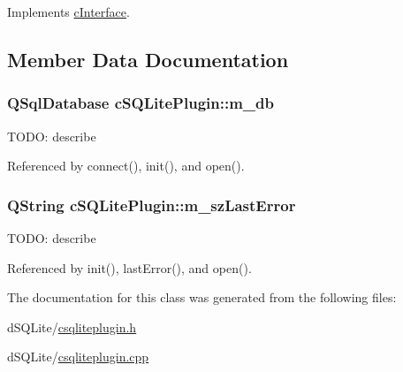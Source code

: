Implements \hyperlink{classc_interface_aadc382036174c2a25bb2c23733830d33}{c\+Interface}.



\subsection{Member Data Documentation}
\subsubsection[{\texorpdfstring{m\+\_\+db}{m_db}}]{\setlength{\rightskip}{0pt plus 5cm}Q\+Sql\+Database c\+S\+Q\+Lite\+Plugin\+::m\+\_\+db\hspace{0.3cm}{\ttfamily [protected]}}\hypertarget{classc_s_q_lite_plugin_a3e3b9845869292d92f7d37e1ffa90df5}{}\label{classc_s_q_lite_plugin_a3e3b9845869292d92f7d37e1ffa90df5}
T\+O\+DO\+: describe 

Referenced by connect(), init(), and open().

\subsubsection[{\texorpdfstring{m\+\_\+sz\+Last\+Error}{m_szLastError}}]{\setlength{\rightskip}{0pt plus 5cm}Q\+String c\+S\+Q\+Lite\+Plugin\+::m\+\_\+sz\+Last\+Error\hspace{0.3cm}{\ttfamily [protected]}}\hypertarget{classc_s_q_lite_plugin_a2f6c0e82b435799bd544d8a1847f4d1a}{}\label{classc_s_q_lite_plugin_a2f6c0e82b435799bd544d8a1847f4d1a}
T\+O\+DO\+: describe 

Referenced by init(), last\+Error(), and open().



The documentation for this class was generated from the following files\+:\begin{DoxyCompactItemize}
\item 
d\+S\+Q\+Lite/\hyperlink{csqliteplugin_8h}{csqliteplugin.\+h}\item 
d\+S\+Q\+Lite/\hyperlink{csqliteplugin_8cpp}{csqliteplugin.\+cpp}\end{DoxyCompactItemize}

